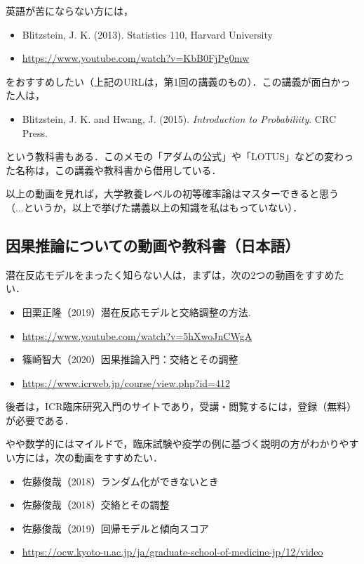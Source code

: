 \documentclass[12pt]{jsarticle}
\begin{document}
英語が苦にならない方には，
\begin{itemize}
\item[] Blitzstein, J. K. (2013). Statistics 110, Harvard University
\item[] \url{https://www.youtube.com/watch?v=KbB0FjPg0mw}
\end{itemize}
をおすすめしたい（上記のURLは，第1回の講義のもの）．この講義が面白かった人は，
\begin{itemize}
\item[] Blitzstein, J. K. and Hwang, J. (2015). {\it Introduction to Probabiliity}. CRC Press.
\end{itemize}
という教科書もある．このメモの「アダムの公式」や「LOTUS」などの変わった名称は，この講義や教科書から借用している．

以上の動画を見れば，大学教養レベルの初等確率論はマスターできると思う
（...というか，以上で挙げた講義以上の知識を私はもっていない）．

\subsection{因果推論についての動画や教科書（日本語）}

潜在反応モデルをまったく知らない人は，まずは，次の2つの動画をすすめたい．

\begin{itemize}
\item[] 田栗正隆（2019）潜在反応モデルと交絡調整の方法. 
\item[] \url{https://www.youtube.com/watch?v=5hXwoJnCWgA}
\end{itemize}

\begin{itemize}
\item[] 篠崎智大（2020）因果推論入門：交絡とその調整
\item[] \url{https://www.icrweb.jp/course/view.php?id=412}
\end{itemize}

後者は，ICR臨床研究入門のサイトであり，受講・閲覧するには，登録（無料）が必要である．

やや数学的にはマイルドで，臨床試験や疫学の例に基づく説明の方がわかりやすい方には，次の動画をすすめたい．
\begin{itemize}
\item[] 佐藤俊哉（2018）ランダム化ができないとき
\item[] 佐藤俊哉（2018）交絡とその調整
\item[] 佐藤俊哉（2019）回帰モデルと傾向スコア
\item[] \url{https://ocw.kyoto-u.ac.jp/ja/graduate-school-of-medicine-jp/12/video}
\end{itemize}
\end{document}

